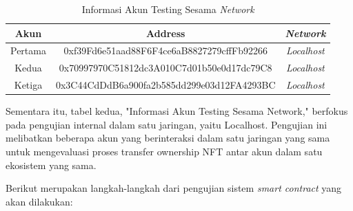 \begin{center}
  \begin{table}[H]
        \centering
        \caption{Informasi Akun Testing Sesama \emph{Network}}
        \begin{tabular}{|c|c|c|}
        \hline
        \textbf{Akun} & \textbf{Address} & \textbf{\emph{Network}}
        \\
        \hline
        Pertama & 0xf39Fd6e51aad88F6F4ce6aB8827279cffFb92266 & \emph{Localhost}
        \\ 
        \hline
        Kedua & 0x70997970C51812dc3A010C7d01b50e0d17dc79C8 & \emph{Localhost} \\
        \hline
        Ketiga & 0x3C44CdDdB6a900fa2b585dd299e03d12FA4293BC & \emph{Localhost} \\
        \hline
        \end{tabular}      
        \label{tab:akun_localhost}
  \end{table}
  \end{center}
  
  Sementara itu, tabel kedua, "Informasi Akun Testing Sesama Network," berfokus pada pengujian internal dalam satu jaringan, yaitu Localhost. Pengujian ini melibatkan beberapa akun yang berinteraksi dalam satu jaringan yang sama untuk mengevaluasi proses transfer ownership NFT antar akun dalam satu ekosistem yang sama.

  Berikut merupakan langkah-langkah dari pengujian sistem \emph{smart contract} yang akan dilakukan:


